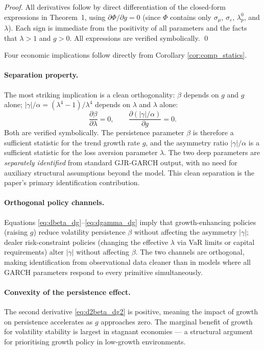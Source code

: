 \documentclass[12pt,a4paper]{article}
\theoremstyle{definition}
\begin{document}
\begin{proof}
All derivatives follow by direct differentiation of the
closed-form expressions in Theorem~1, using $\partial\Phi/\partial g
= 0$ (since $\Phi$ contains only $\sigma_\mu$, $\sigma_\varepsilon$,
$\lambda^0_p$, and $\lambda$). Each sign is immediate from the
positivity of all parameters and the facts that $\lambda > 1$ and
$g > 0$. All expressions are verified symbolically.
\qed
\end{proof}

Four economic implications follow directly from Corollary
\ref{cor:comp_statics}.

\paragraph{Separation property.}
The most striking implication is a clean orthogonality: $\beta$
depends on $g$ and $g$ alone; $|\gamma|/\alpha =
(\lambda^4-1)/\lambda^4$ depends on $\lambda$ and $\lambda$ alone:
\[
\frac{\partial\beta}{\partial\lambda} = 0, \qquad
\frac{\partial(|\gamma|/\alpha)}{\partial g} = 0.
\]
Both are verified symbolically. The persistence
parameter $\beta$ is therefore a sufficient statistic for the
trend growth rate $g$, and the asymmetry ratio
$|\gamma|/\alpha$ is a sufficient statistic for the loss aversion
parameter $\lambda$. The two deep parameters are \emph{separately
identified} from standard GJR-GARCH output, with no need for
auxiliary structural assumptions beyond the model. This clean
separation is the paper's primary identification contribution.

\paragraph{Orthogonal policy channels.}
Equations \eqref{eq:dbeta_dg}--\eqref{eq:dgamma_dg} imply that
growth-enhancing policies (raising $g$) reduce volatility
persistence $\beta$ without affecting the asymmetry $|\gamma|$;
dealer risk-constraint policies (changing the effective $\lambda$
via VaR limits or capital requirements) alter $|\gamma|$ without
affecting $\beta$. The two channels are orthogonal, making
identification from observational data cleaner than in models where
all GARCH parameters respond to every primitive simultaneously.

\paragraph{Convexity of the persistence effect.}
The second derivative \eqref{eq:d2beta_dg2} is positive, meaning
the impact of growth on persistence accelerates as $g$ approaches
zero. The marginal benefit of growth for volatility stability is
largest in stagnant economies --- a structural argument for
prioritising growth policy in low-growth environments.
\end{document}

